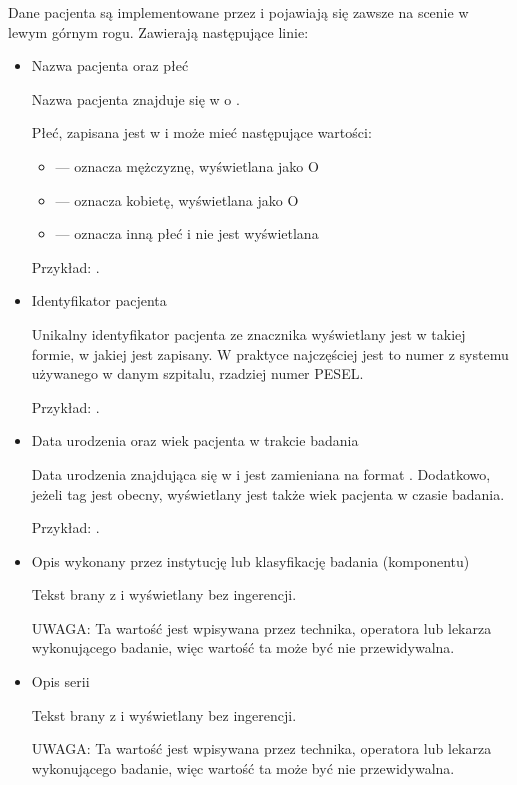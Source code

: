 Dane pacjenta są implementowane przez  i pojawiają się zawsze na scenie w lewym górnym rogu.
Zawierają następujące linie:
\begin{itemize}
    \item Nazwa pacjenta oraz płeć

          Nazwa pacjenta znajduje się w  o .

          Płeć, zapisana jest w  i może mieć następujące wartości:
          \begin{itemize}
              \item {} --- oznacza mężczyznę, wyświetlana jako O
              \item {} --- oznacza kobietę, wyświetlana jako O
              \item {} --- oznacza inną płeć i nie jest wyświetlana
          \end{itemize}

          Przykład: .

    \item Identyfikator pacjenta

          Unikalny identyfikator pacjenta ze znacznika  wyświetlany jest w takiej formie, w jakiej jest zapisany.
          W praktyce najczęściej jest to numer z systemu używanego w danym szpitalu, rzadziej numer PESEL.

          Przykład: .

    \item Data urodzenia oraz wiek pacjenta w trakcie badania

          Data urodzenia znajdująca się w  i jest zamieniana na format .
          Dodatkowo, jeżeli tag  jest obecny, wyświetlany jest także wiek pacjenta w czasie badania.

          Przykład: .

    \item Opis wykonany przez instytucję lub klasyfikację badania (komponentu)

          Tekst brany z  i wyświetlany bez ingerencji.

          UWAGA: Ta wartość jest wpisywana przez technika, operatora lub lekarza wykonującego badanie, więc wartość ta może być nie przewidywalna.

    \item Opis serii

          Tekst brany z  i wyświetlany bez ingerencji.

          UWAGA: Ta wartość jest wpisywana przez technika, operatora lub lekarza wykonującego badanie, więc wartość ta może być nie przewidywalna.
\end{itemize}


